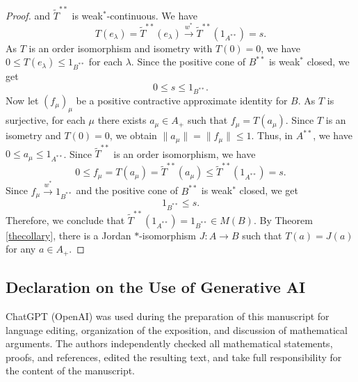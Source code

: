 \documentclass[12pt]{amsart}
\theoremstyle{remark}
\begin{document}
\begin{proof}
and  
$\widetilde T^{**}$ is weak$^*$-continuous. We have
\[
T(e_\lambda)=\widetilde{T}^{**}(e_\lambda) \xrightarrow{w^*} \widetilde{T}^{**}(1_{A^{**}})=s.
\]
As $T$ is an order isomorphism and isometry with $T(0)=0$, we have $0 \le T(e_\lambda) \le 1_{B^{**}}$ for each $\lambda$.  
Since the positive cone of $B^{**}$ is weak$^*$ closed, we get
\[
0\leq s \leq 1_{B^{**}}.
\]
Now let $(f_\mu)_\mu$ be a positive contractive approximate identity for
$B$. As $T$ is surjective, for each $\mu$ there exists
$a_\mu\in A_+$ such that $f_\mu=T(a_\mu)$.
Since $T$ is an isometry and $T(0)=0$, we obtain
$\| a_\mu\|=\| f_\mu\| \leq 1$.
Thus, in $A^{**}$, we have $0\leq a_\mu\leq 1_{A^{**}}$. 
Since $\widetilde{T}^{**}$ is an order isomorphism, we have
\[
0\leq f_\mu=T(a_\mu)=\widetilde{T}^{**}(a_\mu)
\leq \widetilde{T}^{**}(1_{A^{**}})=s.
\]
Since $f_\mu\xrightarrow{w^*}1_{B^{**}}$ and the positive cone of
$B^{**}$ is weak$^*$ closed, we get 
\[
1_{B^{**}}\leq s.
\]
Therefore, we conclude that $\widetilde{T}^{**}(1_{A^{**}})=1_{B^{**}} \in M(B)$. 
By Theorem \ref{thecollary}, there is a Jordan $*$-isomorphism $J:A \to B$ such that  $T(a)=J(a)$ for any $a \in A_{+}$. 
\end{proof}



\subsection*{Declaration on the Use of Generative AI}

ChatGPT (OpenAI) was used during the preparation of this manuscript for language
editing, organization of the exposition, and discussion of mathematical
arguments.  The authors independently checked all mathematical statements,
proofs, and references, edited the resulting text, and take full responsibility
for the content of the manuscript.
\end{document}
